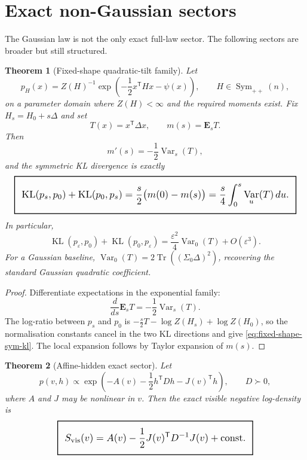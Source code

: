 \documentclass[11pt,a4paper]{article}
\numberwithin{equation}{section}
\DeclareMathOperator{\Tr}{Tr}
\DeclareMathOperator{\Var}{Var}
\DeclareMathOperator{\Sym}{Sym}
\DeclareMathOperator{\KL}{KL}
\newcommand{\E}{\mathbf E}
\newcommand{\geomboxed}[1]{%
  \setlength{\fboxsep}{8pt}%
  \setlength{\fboxrule}{0.9pt}%
  \fbox{\scalebox{1.18}{$\displaystyle #1$}}%
}
\theoremstyle{thmcompact}
\newtheorem{theorem}{Theorem}[section]
\theoremstyle{remark}
\begin{document}
\section{Exact non-Gaussian sectors}

The Gaussian law is not the only exact full-law sector. The following sectors are broader but still structured.

\begin{theorem}[Fixed-shape quadratic-tilt family]
\label{thm:fixed-shape}
Let
\[
p_H(x)=Z(H)^{-1}\exp\!\left(-\frac12x^{\mathsf T}Hx-\psi(x)\right),
\qquad H\in\Sym_{++}(n),
\]
on a parameter domain where $Z(H)<\infty$ and the required moments exist. Fix $H_s=H_0+s\Delta$ and set
\[
T(x)=x^{\mathsf T}\Delta x,\qquad m(s)=\E_sT.
\]
Then
\begin{equation}
m'(s)=-\frac12\Var_s(T),
\label{eq:fixed-shape-monotone}
\end{equation}
and the symmetric KL divergence is exactly
\begin{equation}
\geomboxed{
\KL(p_s,p_0)+\KL(p_0,p_s)
=\frac{s}{2}\bigl(m(0)-m(s)\bigr)
=\frac{s}{4}\int_0^s\Var_u(T)\,du.
}
\label{eq:fixed-shape-sym-kl}
\end{equation}
In particular,
\begin{equation}
\KL(p_\varepsilon,p_0)+\KL(p_0,p_\varepsilon)
=\frac{\varepsilon^2}{4}\Var_0(T)+O(\varepsilon^3).
\label{eq:fixed-shape-local}
\end{equation}
For a Gaussian baseline, $\Var_0(T)=2\Tr((\Sigma_0\Delta)^2)$, recovering the standard Gaussian quadratic coefficient.
\end{theorem}

\begin{proof}
Differentiate expectations in the exponential family:
\[
\frac{d}{ds}\E_sT=-\frac12\Var_s(T).
\]
The log-ratio between $p_s$ and $p_0$ is $-\frac{s}{2}T-\log Z(H_s)+\log Z(H_0)$, so the normalisation constants cancel in the two KL directions and give \eqref{eq:fixed-shape-sym-kl}. The local expansion follows by Taylor expansion of $m(s)$.
\end{proof}

\begin{theorem}[Affine-hidden exact sector]
\label{thm:affine-hidden}
Let
\[
p(v,h)\propto
\exp\!\left(-A(v)-\frac12h^{\mathsf T}Dh-J(v)^{\mathsf T}h\right),
\qquad D\succ0,
\]
where $A$ and $J$ may be nonlinear in $v$. Then the exact visible negative log-density is
\begin{equation}
\geomboxed{
S_{\mathrm{vis}}(v)=A(v)-\frac12J(v)^{\mathsf T}D^{-1}J(v)+\mathrm{const}.
}
\label{eq:affine-hidden}
\end{equation}
\end{theorem}
\end{document}
